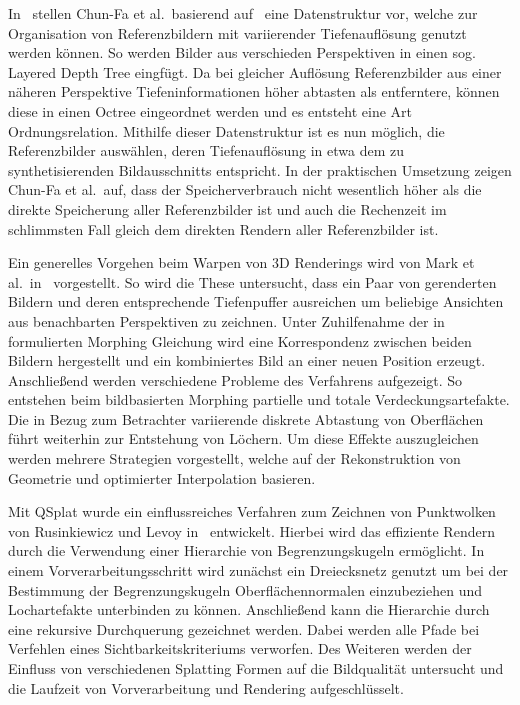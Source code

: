 \documentclass[hyperref, beleg, german]{cgvpub}
\begin{document}
In~\cite{chang1999ldi} stellen Chun-Fa et al.\ basierend auf~\cite{he1998layered}
eine Datenstruktur vor, welche zur Organisation von Referenzbildern mit
variierender Tiefenauflösung genutzt werden können. So werden Bilder aus
verschieden Perspektiven in einen sog. Layered Depth Tree eingfügt. Da bei
gleicher Auflösung Referenzbilder aus einer näheren Perspektive
Tiefeninformationen höher abtasten als entferntere, können diese in einen Octree
eingeordnet werden und es entsteht eine Art Ordnungsrelation. Mithilfe dieser
Datenstruktur ist es nun möglich, die Referenzbilder auswählen, deren
Tiefenauflösung in etwa dem zu synthetisierenden Bildausschnitts entspricht. In
der praktischen Umsetzung zeigen Chun-Fa et al.\ auf, dass der Speicherverbrauch
nicht wesentlich höher als die direkte Speicherung aller Referenzbilder ist und
auch die Rechenzeit im schlimmsten Fall gleich dem direkten Rendern aller
Referenzbilder ist.

Ein generelles Vorgehen beim Warpen von 3D Renderings wird von Mark et al.\
in~\cite{mark1997post} vorgestellt. So wird die These untersucht, dass ein Paar
von gerenderten Bildern und deren entsprechende Tiefenpuffer ausreichen um
beliebige Ansichten aus benachbarten Perspektiven zu zeichnen. Unter
Zuhilfenahme der in~\cite{mcmillan1995head} formulierten Morphing Gleichung
wird eine Korrespondenz zwischen beiden Bildern hergestellt und ein
kombiniertes Bild an einer neuen Position erzeugt. Anschließend werden
verschiedene Probleme des Verfahrens aufgezeigt. So entstehen beim
bildbasierten Morphing partielle und totale Verdeckungsartefakte. Die in Bezug
zum Betrachter variierende diskrete Abtastung von Oberflächen führt weiterhin
zur Entstehung von Löchern. Um diese Effekte auszugleichen werden mehrere
Strategien vorgestellt, welche auf der Rekonstruktion von Geometrie und
optimierter Interpolation basieren.

Mit QSplat wurde ein einflussreiches Verfahren zum Zeichnen von Punktwolken von
Rusinkiewicz und Levoy in~\cite{rusinkiewicz2000qsplat} entwickelt. Hierbei
wird das effiziente Rendern durch die Verwendung einer Hierarchie von
Begrenzungskugeln ermöglicht. In einem Vorverarbeitungsschritt wird zunächst
ein Dreiecksnetz genutzt um bei der Bestimmung der Begrenzungskugeln
Oberflächennormalen einzubeziehen und Lochartefakte unterbinden zu können.
Anschließend kann die Hierarchie durch eine rekursive Durchquerung gezeichnet
werden. Dabei werden alle Pfade bei Verfehlen eines Sichtbarkeitskriteriums
verworfen. Des Weiteren werden der Einfluss von verschiedenen Splatting Formen
auf die Bildqualität untersucht und die Laufzeit von Vorverarbeitung und
Rendering aufgeschlüsselt.
\end{document}
